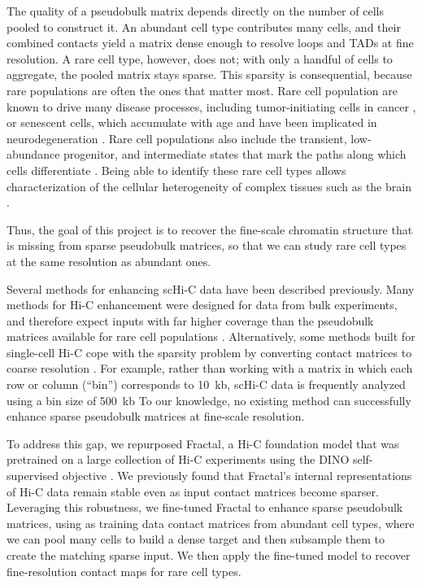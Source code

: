 \documentclass{article}
\begin{document}
The quality of a pseudobulk matrix depends directly on the number of cells pooled to construct it.
An abundant cell type contributes many cells, and their combined contacts yield a matrix dense enough to resolve loops and TADs at fine resolution.
A rare cell type, however, does not; with only a handful of cells to aggregate, the pooled matrix stays sparse.
This sparsity is consequential, because rare populations are often the ones that matter most.
Rare cell population are known to drive many disease processes, including tumor-initiating cells in cancer \cite{}, or senescent cells, which accumulate with age and have been implicated in neurodegeneration \cite{}.
Rare cell populations also include the transient, low-abundance progenitor, and intermediate states that mark the paths along which cells differentiate \cite{}.
Being able to identify these rare cell types allows characterization of the cellular heterogeneity of complex tissues such as the brain \cite{}.

Thus, the goal of this project is to recover the fine-scale chromatin structure that is missing from sparse pseudobulk matrices, so that we can study rare cell types at the same resolution as abundant ones.

Several methods for enhancing scHi-C data have been described previously.
Many methods for Hi-C enhancement were designed for data from bulk experiments, and therefore expect inputs with far higher coverage than the pseudobulk matrices available for rare cell populations \cite{}.
Alternatively, some methods built for single-cell Hi-C cope with the sparsity problem by converting contact matrices to coarse resolution \cite{}.
For example, rather than working with a matrix in which each row or column (``bin'') corresponds to 10~kb, scHi-C data is frequently analyzed using a bin size of 500~kb
To our knowledge, no existing method can successfully enhance sparse pseudobulk matrices at fine-scale resolution.

To address this gap, we repurposed Fractal, a Hi-C foundation model that was pretrained on a large collection of Hi-C experiments using the DINO self-supervised objective \cite{}.
We previously found that Fractal's internal representations of Hi-C data remain stable even as input contact matrices become sparser.
Leveraging this robustness, we fine-tuned Fractal to enhance sparse pseudobulk matrices, using as training data contact matrices from abundant cell types, where we can pool many cells to build a dense target and then subsample them to create the matching sparse input.
We then apply the fine-tuned model to recover fine-resolution contact maps for rare cell types.
\end{document}
